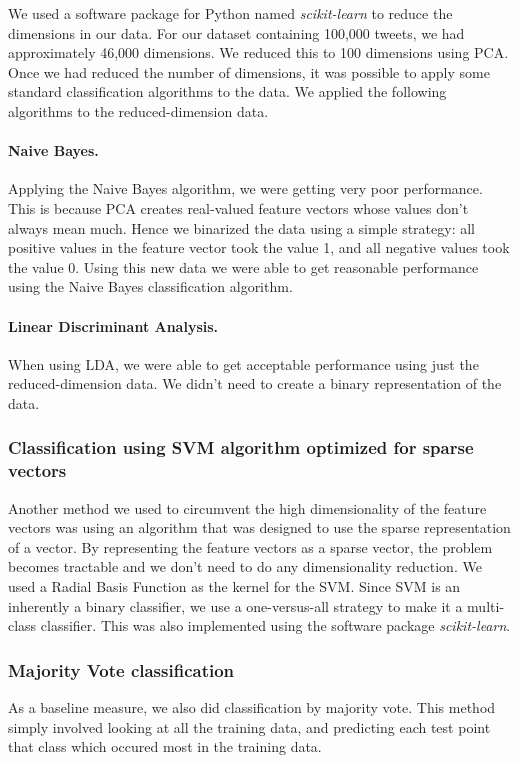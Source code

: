 We used a software package for Python named {\it scikit-learn} to reduce the dimensions in our data. For our dataset containing 100,000 tweets, we had approximately 46,000 dimensions. We reduced this to 100 dimensions using PCA. Once we had reduced the number of dimensions, it was possible to apply some standard classification algorithms to the data. We applied the following algorithms to the reduced-dimension data.

\paragraph{Naive Bayes.}
Applying the Naive Bayes algorithm, we were getting very poor performance. This is because PCA creates real-valued feature vectors whose values don't always mean much. Hence we binarized the data using a simple strategy: all positive values in the feature vector took the value 1, and all negative values took the value 0. Using this new data we were able to get reasonable performance using the Naive Bayes classification algorithm.

\paragraph{Linear Discriminant Analysis.}
When using LDA, we were able to get acceptable performance using just the reduced-dimension data. We didn't need to create a binary representation of the data.

\subsubsection{Classification using SVM algorithm optimized for sparse vectors}
Another method we used to circumvent the high dimensionality of the feature vectors was using an algorithm that was designed to use the sparse representation of a vector. By representing the feature vectors as a sparse vector, the problem becomes tractable and we don't need to do any dimensionality reduction. We used a Radial Basis Function as the kernel for the SVM. Since SVM is an inherently a binary classifier, we use a one-versus-all strategy to make it a multi-class classifier. This was also implemented using the software package {\it scikit-learn}.

\subsubsection{Majority Vote classification}
As a baseline measure, we also did classification by majority vote. This method simply involved looking at all the training data, and predicting each test point that class which occured most in the training data.